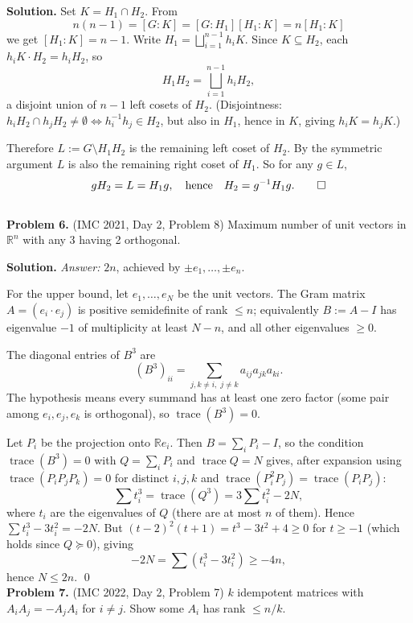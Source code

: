 \documentclass{article}
\newcommand{\R}{\mathbb{R}}
\newcommand{\tr}{\operatorname{trace}}
\begin{document}
\textbf{Solution.} Set \( K = H_1 \cap H_2 \). From
\[
n(n-1) = [G:K] = [G:H_1][H_1:K] = n[H_1:K]
\]
we get \( [H_1 : K] = n - 1 \). Write \( H_1 = \bigsqcup_{i=1}^{n-1} h_i K \). Since \( K \subseteq H_2 \), each \( h_i K \cdot H_2 = h_i H_2 \), so
\[
H_1 H_2 = \bigsqcup_{i=1}^{n-1} h_i H_2,
\]
a disjoint union of \( n - 1 \) left cosets of \( H_2 \). (Disjointness: \( h_i H_2 \cap h_j H_2 \neq \emptyset \Leftrightarrow h_i^{-1} h_j \in H_2 \), but also in \( H_1 \), hence in \( K \), giving \( h_i K = h_j K \).)

Therefore \( L := G \setminus H_1 H_2 \) is the remaining left coset of \( H_2 \). By the symmetric argument \( L \) is also the remaining right coset of \( H_1 \). So for any \( g \in L \),
\[
g H_2 = L = H_1 g, \quad \text{hence} \quad H_2 = g^{-1} H_1 g. \qed
\]
\\

\textbf{Problem 6.} (IMC 2021, Day 2, Problem 8)
Maximum number of unit vectors in \( \R^n \) with any 3 having 2 orthogonal.

\textbf{Solution.} \textit{Answer:} \( 2n \), achieved by \( \pm e_1, \ldots, \pm e_n \).

For the upper bound, let \( e_1, \ldots, e_N \) be the unit vectors. The Gram matrix \( A = (e_i \cdot e_j) \) is positive semidefinite of rank \( \leq n \); equivalently \( B := A - I \) has eigenvalue \( -1 \) of multiplicity at least \( N - n \), and all other eigenvalues \( \geq 0 \).

The diagonal entries of \( B^3 \) are
\[
(B^3)_{ii} = \sum_{j, k \neq i,\; j \neq k} a_{ij} a_{jk} a_{ki}.
\]
The hypothesis means every summand has at least one zero factor (some pair among \( e_i, e_j, e_k \) is orthogonal), so \( \tr(B^3) = 0 \).

Let \( P_i \) be the projection onto \( \R e_i \). Then \( B = \sum_i P_i - I \), so the condition \( \tr(B^3) = 0 \) with \( Q = \sum_i P_i \) and \( \tr Q = N \) gives, after expansion using \( \tr(P_i P_j P_k) = 0 \) for distinct \( i, j, k \) and \( \tr(P_i^2 P_j) = \tr(P_i P_j) \):
\[
\sum t_i^3 = \tr(Q^3) = 3 \sum t_i^2 - 2 N,
\]
where \( t_i \) are the eigenvalues of \( Q \) (there are at most \( n \) of them). Hence \( \sum t_i^3 - 3 t_i^2 = -2 N \). But \( (t - 2)^2 (t + 1) = t^3 - 3 t^2 + 4 \geq 0 \) for \( t \geq -1 \) (which holds since \( Q \succeq 0 \)), giving
\[
-2 N = \sum (t_i^3 - 3 t_i^2) \geq -4 n,
\]
hence \( N \leq 2 n \). \qed
\\

\textbf{Problem 7.} (IMC 2022, Day 2, Problem 7)
\( k \) idempotent matrices with \( A_i A_j = -A_j A_i \) for \( i \neq j \). Show some \( A_i \) has rank \( \leq n/k \).
\end{document}
